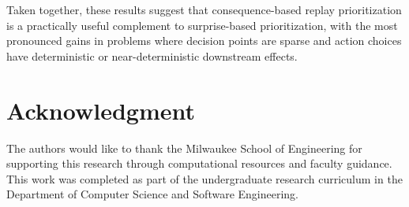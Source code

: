 \documentclass[conference]{IEEEtran}
\begin{document}
Taken together, these results suggest that consequence-based replay prioritization is a
practically useful complement to surprise-based prioritization, with the most pronounced gains
in problems where decision points are sparse and action choices have deterministic or near-deterministic
downstream effects.

\section*{Acknowledgment}
The authors would like to thank the Milwaukee School of Engineering for supporting this research through computational resources and faculty guidance. This work was completed as part of the undergraduate research curriculum in the Department of Computer Science and Software Engineering.

\newpage
\printbibliography
\end{document}
